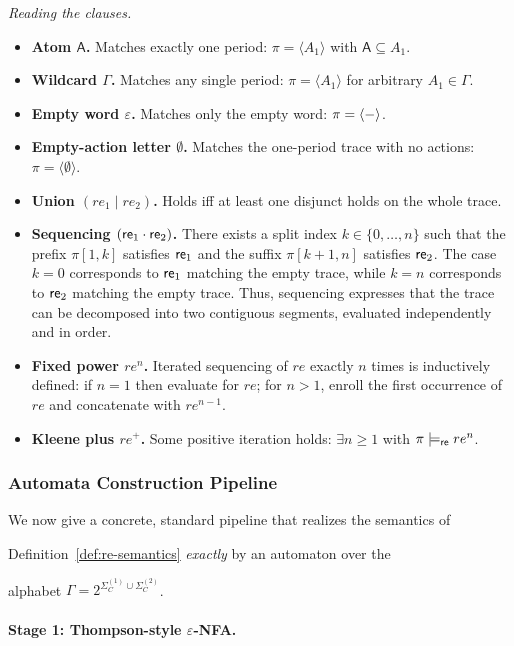 \noindent
{\emph{Reading the clauses.}}
\begin{itemize}
  \item \textbf{Atom $\mathsf{A}$.} Matches exactly one period: $\pi=\langle A_1\rangle$ with $\mathsf{A}\subseteq A_1$.
  \item \textbf{Wildcard $\Gamma$.} Matches any single period: $\pi=\langle A_1\rangle$ for arbitrary $A_1\in\Gamma$.
  \item \textbf{Empty word $\varepsilon$.} Matches only the empty word: $\pi= \langle - \rangle $.
  \item \textbf{Empty-action letter $\emptyset$.} Matches the one-period trace with no actions: $\pi=\langle \emptyset\rangle$.
  \item \textbf{Union $(re_1\mid re_2)$.} Holds iff at least one disjunct holds on the whole trace.
  \item \textbf{Sequencing $(\mathsf{re}_1 \cdot \mathsf{re}_2)$.}
There exists a split index $k\in\{0,\dots,n\}$ such that the prefix
$\pi[1,k]$ satisfies $\mathsf{re}_1$ and the suffix $\pi[k+1,n]$ satisfies $\mathsf{re}_2$.
The case $k=0$ corresponds to $\mathsf{re}_1$ matching the empty trace, while
$k=n$ corresponds to $\mathsf{re}_2$ matching the empty trace.
Thus, sequencing expresses that the trace can be decomposed into two
contiguous segments, evaluated independently and in order.
  \item \textbf{Fixed power $re^n$.} Iterated sequencing of $re$ exactly $n$ times is inductively defined:
        if $n=1$ then evaluate for $re$; for $n>1$, enroll the first occurrence of $re$ and concatenate with $re^{n-1}$.
  \item \textbf{Kleene plus $re^+$.} Some positive iteration holds: $\exists n\ge1$ with $\pi\models_{\mathsf{re}} re^n$.
\end{itemize}

\subsubsection{Automata Construction Pipeline}

\label{subsec:re-to-dfa}



We now give a concrete, standard pipeline that realizes the semantics of

Definition~\ref{def:re-semantics} \emph{exactly} by an automaton over the

alphabet $\Gamma=2^{\Sigma_C^{(1)}\cup\Sigma_C^{(2)}}$.



{\paragraph*{Stage 1: Thompson-style $\varepsilon$-NFA.}}

